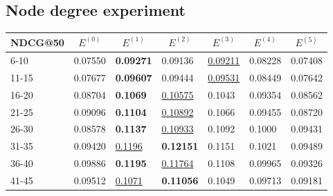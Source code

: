 \subsection{Node degree experiment}

\begin{table*}[]
    \begin{tabular}{|l|l|l|l|l|l|l|}
    \hline
    NDCG@50 & \multicolumn{1}{c|}{$E^{(0)}$} & \multicolumn{1}{c|}{$E^{(1)}$} & \multicolumn{1}{c|}{$E^{(2)}$} & \multicolumn{1}{c|}{$E^{(3)}$} & \multicolumn{1}{c|}{$E^{(4)}$} & \multicolumn{1}{c|}{$E^{(5)}$} \\ \hline
    6-10    & 0.07550                        & \textbf{0.09271}               & 0.09136                        & \underline{0.09211}            & 0.08228                        & 0.07408                        \\ \hline
    11-15   & 0.07677                        & \textbf{0.09607}               & 0.09444                        & \underline{0.09531}            & 0.08449                        & 0.07642                        \\ \hline
    16-20   & 0.08704                        & \textbf{0.1069}                & \underline{0.10575}            & 0.1043                         & 0.09354                        & 0.08562                        \\ \hline
    21-25   & 0.09096                        & \textbf{0.1104}                & \underline{0.10892}            & 0.1066                         & 0.09455                        & 0.08720                        \\ \hline
    26-30   & 0.08578                        & \textbf{0.1137}                & \underline{0.10933}            & 0.1092                         & 0.1000                         & 0.09431                        \\ \hline
    31-35   & 0.09420                        & \underline{0.1196}             & \textbf{0.12151}               & 0.1151                         & 0.1021                         & 0.09489                        \\ \hline
    36-40   & 0.09886                        & \textbf{0.1195}                & \underline{0.11764}            & 0.1108                         & 0.09965                        & 0.09326                        \\ \hline
    41-45   & 0.09512                        & \underline{0.1071}             & \textbf{0.11056}               & 0.1049                         & 0.09713                        & 0.09181                        \\ \hline

\end{tabular}
\end{table*}
